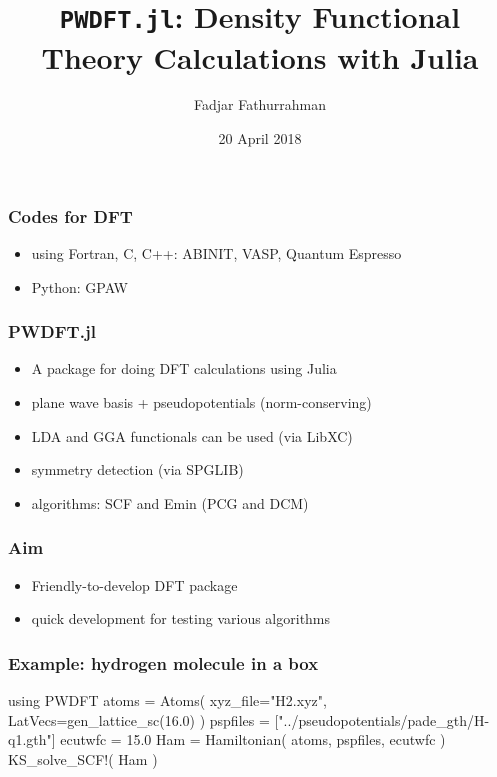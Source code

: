 \documentclass[english,9pt]{beamer}
\begin{document}
\title{\texttt{PWDFT.jl}: Density Functional Theory Calculations with Julia}
\author{Fadjar Fathurrahman}
\date{20 April 2018}

\frame{\titlepage}

\begin{frame}
\frametitle{Codes for DFT}

\begin{itemize}
\item using Fortran, C, C++: ABINIT, VASP, Quantum Espresso
\item Python: GPAW
\end{itemize}

\end{frame}


\begin{frame}
\frametitle{PWDFT.jl}

\begin{itemize}
\item A package for doing DFT calculations using Julia
\item plane wave basis + pseudopotentials (norm-conserving)
\item LDA and GGA functionals can be used (via LibXC)
\item symmetry detection (via SPGLIB)
\item algorithms: SCF and Emin (PCG and DCM)
\end{itemize}

\end{frame}


\begin{frame}
\frametitle{Aim}

\begin{itemize}
\item Friendly-to-develop DFT package
\item quick development for testing various algorithms
\end{itemize}

\end{frame}


\begin{frame}[fragile]
\frametitle{Example: hydrogen molecule in a box}

\begin{juliacode}
using PWDFT
atoms = Atoms( xyz_file="H2.xyz",
               LatVecs=gen_lattice_sc(16.0) )
pspfiles = ["../pseudopotentials/pade_gth/H-q1.gth"]
ecutwfc = 15.0
Ham = Hamiltonian( atoms, pspfiles, ecutwfc )
KS_solve_SCF!( Ham )
\end{juliacode}

\end{frame}
\end{document}

